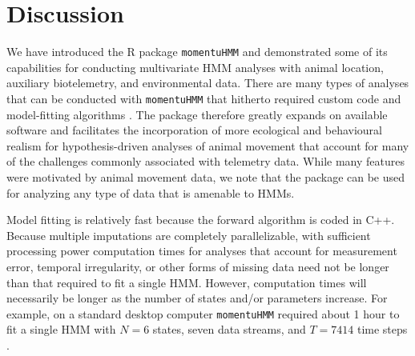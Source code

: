 \documentclass[12pt]{article}\usepackage[]{graphicx}\usepackage[]{color}
\begin{document}
\section{Discussion}
\label{sec:discuss}
We have introduced the R package \verb|momentuHMM| and demonstrated some of its capabilities for conducting multivariate HMM analyses with animal location, auxiliary biotelemetry, and environmental data. %
There are many types of analyses that can be conducted with \verb|momentuHMM| that hitherto required custom code and model-fitting algorithms \citep[e.g.][Fig. \ref{fig:sesTracks}]{McClintockEtAl2013c,McClintockEtAl2017,LangrockEtAl2014,MichelotEtAl2017}%
. The package therefore greatly expands on available software and facilitates the incorporation of more ecological and behavioural realism for hypothesis-driven analyses of animal movement that account for many of the challenges commonly associated with telemetry data. While many features were motivated by animal movement data, we note that the package can be used for analyzing any type of data that is amenable to HMMs.

Model fitting is relatively fast because the forward algorithm is coded in C++. Because multiple imputations are completely parallelizable, with sufficient processing power computation times for analyses that account for measurement error, temporal irregularity, or other forms of missing data need not be longer than that required to fit a single HMM.  However, computation times will necessarily be longer as the number of states and/or parameters increase. For example, on a standard desktop computer \verb|momentuHMM| required about 1 hour to fit a single HMM with $N=6$ states, seven data streams, and $T=7414$ time steps \citep{McClintock2017}.
\end{document}
